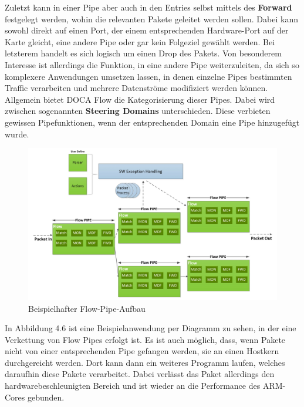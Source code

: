 Zuletzt kann in einer Pipe aber auch in den Entries selbst mittels des \textbf{Forward} festgelegt werden, wohin die relevanten Pakete geleitet werden sollen. Dabei kann sowohl direkt auf einen Port, der einem entsprechenden Hardware-Port auf der Karte gleicht, eine andere Pipe oder gar kein Folgeziel gewählt werden. Bei letzterem handelt es sich logisch um einen Drop des Pakets. Von besonderem Interesse ist allerdings die Funktion, in eine andere Pipe weiterzuleiten, da sich so komplexere Anwendungen umsetzen lassen, in denen einzelne Pipes bestimmten Traffic verarbeiten und mehrere Datenströme modifiziert werden können. Allgemein bietet DOCA Flow die Kategorisierung dieser Pipes. Dabei wird zwischen sogenannten \textbf{Steering Domains} unterschieden. Diese verbieten gewissen Pipefunktionen, wenn der entsprechenden Domain eine Pipe hinzugefügt wurde. 
\begin{figure}
    \centering
    \includegraphics[width=1\linewidth]{images/Screenshot 2025-04-30 at 11-16-05 DOCA Flow - NVIDIA Docs.png}
    \caption{Beispielhafter Flow-Pipe-Aufbau}
    \label{fig:enter-label}
\end{figure}

In Abbildung 4.6 ist eine Beispielanwendung per Diagramm zu sehen, in der eine Verkettung von Flow Pipes erfolgt ist. Es ist auch möglich, dass, wenn Pakete nicht von einer entsprechenden Pipe gefangen werden, sie an einen Hostkern durchgereicht werden. Dort kann dann ein weiteres Programm laufen, welches daraufhin diese Pakete verarbeitet. Dabei verlässt das Paket allerdings den hardwarebeschleunigten Bereich und ist wieder an die Performance des ARM-Cores gebunden.
